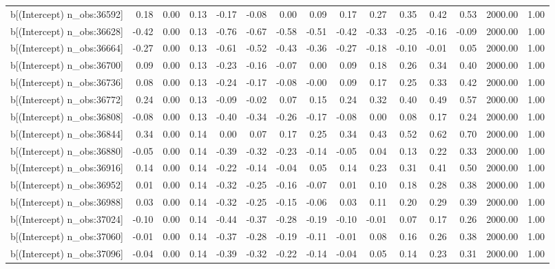 \begin{table}[ht]
\begin{tabular}{rrrrrrrrrrrrrrr}
  b[(Intercept) n\_obs:36592] & 0.18 & 0.00 & 0.13 & -0.17 & -0.08 & 0.00 & 0.09 & 0.17 & 0.27 & 0.35 & 0.42 & 0.53 & 2000.00 & 1.00 \\ 
  b[(Intercept) n\_obs:36628] & -0.42 & 0.00 & 0.13 & -0.76 & -0.67 & -0.58 & -0.51 & -0.42 & -0.33 & -0.25 & -0.16 & -0.09 & 2000.00 & 1.00 \\ 
  b[(Intercept) n\_obs:36664] & -0.27 & 0.00 & 0.13 & -0.61 & -0.52 & -0.43 & -0.36 & -0.27 & -0.18 & -0.10 & -0.01 & 0.05 & 2000.00 & 1.00 \\ 
  b[(Intercept) n\_obs:36700] & 0.09 & 0.00 & 0.13 & -0.23 & -0.16 & -0.07 & 0.00 & 0.09 & 0.18 & 0.26 & 0.34 & 0.40 & 2000.00 & 1.00 \\ 
  b[(Intercept) n\_obs:36736] & 0.08 & 0.00 & 0.13 & -0.24 & -0.17 & -0.08 & -0.00 & 0.09 & 0.17 & 0.25 & 0.33 & 0.42 & 2000.00 & 1.00 \\ 
  b[(Intercept) n\_obs:36772] & 0.24 & 0.00 & 0.13 & -0.09 & -0.02 & 0.07 & 0.15 & 0.24 & 0.32 & 0.40 & 0.49 & 0.57 & 2000.00 & 1.00 \\ 
  b[(Intercept) n\_obs:36808] & -0.08 & 0.00 & 0.13 & -0.40 & -0.34 & -0.26 & -0.17 & -0.08 & 0.00 & 0.08 & 0.17 & 0.24 & 2000.00 & 1.00 \\ 
  b[(Intercept) n\_obs:36844] & 0.34 & 0.00 & 0.14 & 0.00 & 0.07 & 0.17 & 0.25 & 0.34 & 0.43 & 0.52 & 0.62 & 0.70 & 2000.00 & 1.00 \\ 
  b[(Intercept) n\_obs:36880] & -0.05 & 0.00 & 0.14 & -0.39 & -0.32 & -0.23 & -0.14 & -0.05 & 0.04 & 0.13 & 0.22 & 0.33 & 2000.00 & 1.00 \\ 
  b[(Intercept) n\_obs:36916] & 0.14 & 0.00 & 0.14 & -0.22 & -0.14 & -0.04 & 0.05 & 0.14 & 0.23 & 0.31 & 0.41 & 0.50 & 2000.00 & 1.00 \\ 
  b[(Intercept) n\_obs:36952] & 0.01 & 0.00 & 0.14 & -0.32 & -0.25 & -0.16 & -0.07 & 0.01 & 0.10 & 0.18 & 0.28 & 0.38 & 2000.00 & 1.00 \\ 
  b[(Intercept) n\_obs:36988] & 0.03 & 0.00 & 0.14 & -0.32 & -0.25 & -0.15 & -0.06 & 0.03 & 0.11 & 0.20 & 0.29 & 0.39 & 2000.00 & 1.00 \\ 
  b[(Intercept) n\_obs:37024] & -0.10 & 0.00 & 0.14 & -0.44 & -0.37 & -0.28 & -0.19 & -0.10 & -0.01 & 0.07 & 0.17 & 0.26 & 2000.00 & 1.00 \\ 
  b[(Intercept) n\_obs:37060] & -0.01 & 0.00 & 0.14 & -0.37 & -0.28 & -0.19 & -0.11 & -0.01 & 0.08 & 0.16 & 0.26 & 0.38 & 2000.00 & 1.00 \\ 
  b[(Intercept) n\_obs:37096] & -0.04 & 0.00 & 0.14 & -0.39 & -0.32 & -0.22 & -0.14 & -0.04 & 0.05 & 0.14 & 0.23 & 0.31 & 2000.00 & 1.00 \\ 

\end{tabular}
\end{table}
